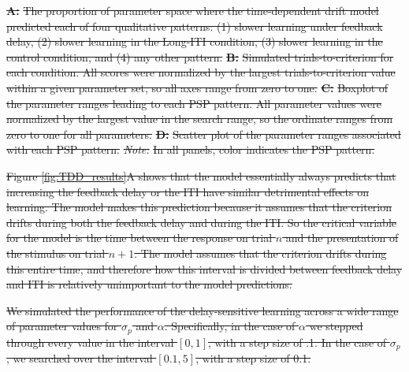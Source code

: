 \documentclass[doc, floatsintext]{apa7}
\providecommand{\DIFdel}[1]{{\protect\color{red}\sout{#1}}}                      %
\providecommand{\DIFdelFL}[1]{\DIFdel{#1}} %
\begin{document}
{%
\textbf{\DIFdelFL{A:}} %
\DIFdelFL{The proportion of parameter space where
      the time-dependent drift model predicted each of four
      qualitative patterns: (1) slower learning under
      feedback delay, (2) slower learning in the Long-ITI
      condition, (3) slower learning in the control
      condition, and (4) any other pattern. 
      }\textbf{\DIFdelFL{B:}} %
\DIFdelFL{Simulated trials-to-criterion for each
      condition. All scores were normalized by the largest
      trials-to-criterion value within a given parameter
      set, so all axes range from zero to one. 
      }\textbf{\DIFdelFL{C:}} %
\DIFdelFL{Boxplot of the parameter ranges leading to
      each PSP pattern. All parameter values were normalized
      by the largest value in the search range, so the
      ordinate ranges from zero to one for all parameters.
      }\textbf{\DIFdelFL{D:}} %
\DIFdelFL{Scatter plot of the parameter ranges
      associated with each PSP pattern. 
      }\textit{\DIFdelFL{Note:}} %
\DIFdelFL{In all panels, color indicates the PSP
      pattern.
}}

\DIFdel{Figure \ref{fig:TDD_results}A shows that the model
essentially always predicts that increasing the feedback
delay or the ITI have similar detrimental effects on
learning. The model makes this prediction because it assumes
that the criterion drifts during both the feedback delay and
during the ITI. So the critical variable for the model is
the time between the response on trial $n$ and the
presentation of
the stimulus on trial $n+1$. The model
assumes that the criterion drifts during this entire time,
and therefore how this interval is divided between feedback
delay and ITI is relatively unimportant to the model
predictions. 
}%

\DIFdel{We simulated the performance of the delay-sensitive learning
across a wide range of parameter values for $\sigma_p$ and
$\alpha$. Specifically, in the case of $\alpha$ we stepped
through every value in the interval $[0, 1]$, with a step
size of .1. In the case of $\sigma_p$, we searched over the
interval $[0.1, 5]$, with a step size of 0.1. 
}%
\end{document}
